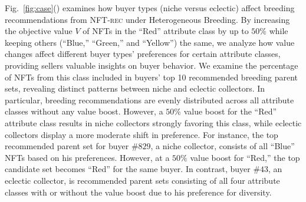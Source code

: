 \documentclass[conference]{IEEEtran}
\theoremstyle{plain}
\begin{document}
{Fig.~\ref{fig:case}()  examines how buyer types (niche versus eclectic) affect breeding recommendations from \textsc{NFT-rec}\xspace under Heterogeneous Breeding\xspace. By increasing the objective value $V$ of NFTs in the ``Red'' attribute class by up to $50\%$ while keeping others (``Blue,'' ``Green,'' and ``Yellow'') the same, we analyze how value changes affect different buyer types' preferences for certain attribute classes, providing sellers valuable insights on buyer behavior. We examine the percentage of NFTs from this class included in buyers' top 10 recommended breeding parent sets, revealing distinct patterns between niche and eclectic collectors. In particular, breeding recommendations are evenly distributed across all attribute classes without any value boost. However, a $50\%$ value boost for the ``Red'' attribute class results in niche collectors strongly favoring this class, while eclectic collectors display a more moderate shift in preference. For instance, the top recommended parent set for buyer $\#829$, a niche collector, consists of all ``Blue'' NFTs based on his preferences. However, at a $50\%$ value boost for ``Red,'' the top candidate set becomes ``Red'' for the same buyer. In contrast, buyer $\#43$, an eclectic collector, is recommended parent sets consisting of all four attribute classes with or without the value boost due to his preference for diversity.
}
\end{document}
